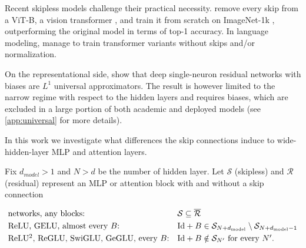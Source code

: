 \documentclass[10pt]{article}
\theoremstyle{definition}
\theoremstyle{remark}
\newcommand{\dm}{d_{\mathrm{model}}}
\begin{document}
Recent skipless models challenge their practical necessity. \citet{ji2026cutting} remove every skip from a ViT-B, a vision transformer \citep{dosovitskiy2021an}, and train it from scratch on ImageNet-1k \citep{russakovsky2015imagenet}, outperforming the original model in terms of top-1 accuracy. In language modeling, \citet{he2023shortcuts, he2024simplifying} manage to train transformer variants without skips and/or normalization.


On the representational side, \citet{lin2018resnet} show that deep single-neuron residual networks with biases are $L^1$ universal approximators. The result is however limited to the narrow regime with respect to the hidden layers and requires biases, which are excluded in a large portion of both academic and deployed models \citep{olmo2025olmo2,yang2025qwen3,liu2026ministral3,mistral2026small4,karpathy2023nanogpt} (see \cref{app:universal} for more details).

In this work we investigate what differences the skip connections induce to wide-hidden-layer MLP and attention layers.

Fix $d_{model} >1$ and $N > d $ be the number of hidden layer. Let $\mathcal S$ (skipless) and $\mathcal R$ (residual) represent an MLP or attention block with and without a skip connection 

\begin{equation}\label{eq:classes}
\begin{array}{@{}ll@{}}
\text{networks, any blocks:} & \mathcal S \subseteq \overline{\mathcal R}\\[3pt]
\text{ReLU, GELU, almost every $B$:} & \mathrm{Id} + B \in \mathcal S_{N+\dm} \setminus \mathcal S_{N+\dm-1}\\[3pt]
\text{ReLU$^2$, ReGLU, SwiGLU, GeGLU, every $B$:} & \mathrm{Id} + B \notin \mathcal S_{N'} \text{ for every } N'.
\end{array}
\end{equation}
\end{document}
